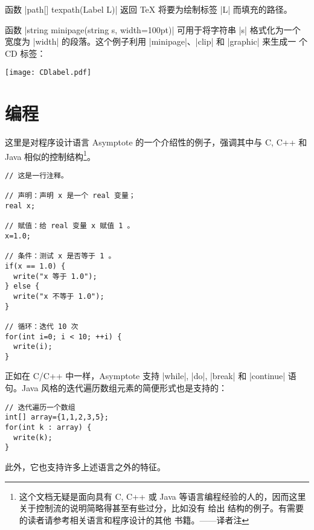 \documentclass{ctexbook}
\newcommand*\prgname[1]{\textsf{#1}}
\newcommand\transnote[1]{\footnote{#1——译者注}}
\begin{document}
函数 |path[] texpath(Label L)| 返回 \TeX{} 将要为绘制标签 |L| 而填充的路径。

函数 |string minipage(string s, width=100pt)| 可用于将字符串 |s| 格式化为一个
宽度为 |width| 的段落。这个例子利用 |minipage|、|clip| 和 |graphic| 来生成一
个 CD 标签：
\begin{center}
  \texttt{[image: CDlabel.pdf]}
\end{center}



\chapter{编程}
\label{chap:programming}

这里是对程序设计语言 \prgname{Asymptote} 的一个介绍性的例子，强调其中与
C, C++ 和 Java 相似的控制结构\transnote{这个文档无疑是面向具有 C, C++ 或 Java
等语言编程经验的人的，因而这里关于控制流的说明简略得甚至有些过分，比如没有
给出 \inlinecode{do} 结构的例子。有需要的读者请参考相关语言和程序设计的其他
书籍。}。

\begin{lstlisting}
// 这是一行注释。

// 声明：声明 x 是一个 real 变量；
real x;

// 赋值：给 real 变量 x 赋值 1 。
x=1.0;

// 条件：测试 x 是否等于 1 。
if(x == 1.0) {
  write("x 等于 1.0");
} else {
  write("x 不等于 1.0");
}

// 循环：迭代 10 次
for(int i=0; i < 10; ++i) {
  write(i);
}
\end{lstlisting}

正如在 C/C++ 中一样，\prgname{Asymptote} 支持 |while|, |do|, |break| 和
|continue| 语句。Java 风格的迭代遍历数组元素的简便形式也是支持的：
\begin{lstlisting}
// 迭代遍历一个数组
int[] array={1,1,2,3,5};
for(int k : array) {
  write(k);
}
\end{lstlisting}
此外，它也支持许多上述语言之外的特征。
\end{document}
